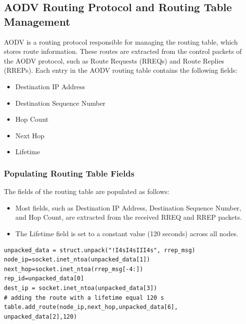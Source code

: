 \documentclass[]{nsm-thesis}
\begin{document}
\subsection{AODV Routing Protocol and Routing Table Management}
AODV  is a routing protocol responsible for managing the routing table, which stores route information. These routes are extracted from the control packets of the AODV protocol, such as Route Requests (RREQs) and Route Replies (RREPs). Each entry in the AODV routing table contains the following fields:
\begin{itemize}
    \item Destination IP Address
    \item Destination Sequence Number
    \item Hop Count
    \item Next Hop
    \item Lifetime
\end{itemize}
\subsubsection{Populating Routing Table Fields}
The fields of the routing table are populated as follows:
\begin{itemize}
    \item Most fields, such as Destination IP Address, Destination Sequence Number, and Hop Count, are extracted from the received RREQ and RREP packets.
    
    \item The Lifetime field is set to a constant value (120 seconds) across all nodes.
\end{itemize}
\lstset{
  basicstyle=\ttfamily\small,  %
  numbers=left,               %
  numberstyle=\tiny,          %
  stepnumber=1,               %
  numbersep=5pt,              %
  showstringspaces=false,     %
  frame=single,               %
  breaklines=true,            %
  captionpos=b,               %
  language=Python             %
}
\begin{lstlisting}[caption={Populating Routing Table Fields Code}, label={lst:example}]
unpacked_data = struct.unpack("!I4sI4sIII4s", rrep_msg)
node_ip=socket.inet_ntoa(unpacked_data[1])
next_hop=socket.inet_ntoa(rrep_msg[-4:])
rep_id=unpacked_data[0]
dest_ip = socket.inet_ntoa(unpacked_data[3])
# adding the route with a lifetime equal 120 s
table.add_route(node_ip,next_hop,unpacked_data[6],
unpacked_data[2],120)
\end{lstlisting}
\end{document}
